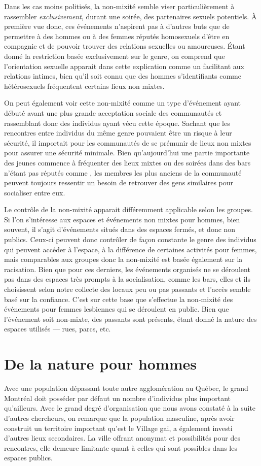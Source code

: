 Dans les cas moins politisés, la non-mixité semble viser particulièrement à rassembler \emph{exclusivement}, durant une soirée, des partenaires sexuels potentiels.
À première vue donc, ces événements n'aspirent pas à d'autres buts que de permettre à des hommes ou à des femmes réputés homosexuels d'être en compagnie et de pouvoir trouver des relations sexuelles ou amoureuses.
Étant donné la restriction basée exclusivement sur le genre, on comprend que l'orientation sexuelle apparait dans cette explication comme un facilitant aux relations intimes, bien qu'il soit connu que des hommes s'identifiants comme hétérosexuels fréquentent certains lieux non mixtes.

On peut également voir cette non-mixité comme un type d'événement ayant débuté avant une plus grande acceptation sociale des communautés \lgbt{} et rassemblant donc des individus ayant vécu cette époque.
Sachant que les rencontres entre individus du même genre pouvaient être un risque à leur sécurité, il importait pour les communautés \lgbt{} de se prémunir de lieux non mixtes pour assurer une sécurité minimale.
Bien qu'aujourd'hui une partie importante des jeunes \lgbt{} commence à fréquenter des lieux mixtes ou des soirées dans des bars n'étant pas réputés comme \lgbt{}, les membres les plus anciens de la communauté peuvent toujours ressentir un besoin de retrouver des gens similaires pour socialiser entre eux.

Le contrôle de la non-mixité apparait différemment applicable selon les groupes.
Si l'on s'intéresse aux espaces et événements non mixtes pour hommes, bien souvent, il s'agit d'événements situés dans des espaces fermés, et donc non publics.
Ceux-ci peuvent donc contrôler de façon constante le genre des individus qui peuvent accéder à l'espace, à la différence de certaines activités pour femmes, mais comparables aux groupes donc la non-mixité est basée également sur la racisation.
Bien que pour ces derniers, les événements organisés ne se déroulent pas dans des espaces très prompts à la socialisation, comme les bars, elles et ils choisissent selon notre collecte des locaux peu ou pas passants et l'accès semble basé sur la confiance.
C'est sur cette base que s'effectue la non-mixité des événements pour femmes lesbiennes qui se déroulent en public.
Bien que l'événement soit non-mixte, des passants sont présents, étant donné la nature des espaces utilisés --- rues, parcs, etc.

\section{De la nature pour hommes}
\label{sec:de_la_nature_pour_hommes}
Avec une population dépassant toute autre agglomération au Québec, le grand Montréal doit posséder par défaut un nombre d'individus \lgbt{} plus important qu'ailleurs.
Avec le grand degré d'organisation que nous avons constaté à la suite d'autres chercheurs, on remarque que la population masculine, après avoir construit un territoire important qu'est le Village gai, a également investi d'autres lieux secondaires.
La ville offrant anonymat et possibilités pour des rencontres, elle demeure limitante quant à celles qui sont possibles dans les espaces publics.

